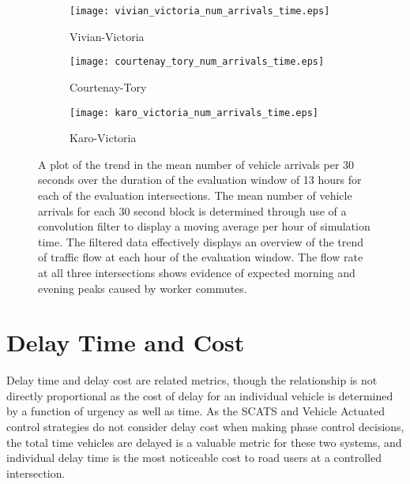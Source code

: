 \begin{figure}
\centering
\begin{subfigure}{.5\textwidth}
  \centering
  \texttt{[image: vivian\_victoria\_num\_arrivals\_time.eps]}
  \caption{Vivian-Victoria}
  \label{vehiclearrivalstime:sub1}
\end{subfigure}%
\begin{subfigure}{.5\textwidth}
  \centering
  \texttt{[image: courtenay\_tory\_num\_arrivals\_time.eps]}
  \caption{Courtenay-Tory}
  \label{vehiclearrivalstime:sub2}
\end{subfigure}

\vspace{1cm}

\begin{subfigure}{.5\textwidth}
  \centering
  \texttt{[image: karo\_victoria\_num\_arrivals\_time.eps]}
  \caption{Karo-Victoria}
  \label{vehiclearrivalstime:sub3}
\end{subfigure}%
\caption[Results of measuring the mean number of vehicle arrivals for each intersection evaluated.]{ A plot of the trend in the mean number of vehicle arrivals per 30 seconds over the duration of the evaluation window of 13 hours for each of the evaluation intersections. The mean number of vehicle arrivals for each 30 second block is determined through use of a convolution filter to display a moving average per hour of simulation time. The filtered data effectively displays an overview of the trend of traffic flow at each hour of the evaluation window. The flow rate at all three intersections shows evidence of expected morning and evening peaks caused by worker commutes. }
\label{eval:vehiclearrivalstime}
\end{figure}

\section {Delay Time and Cost}
\label{sec:incurred_delay_cost}

Delay time and delay cost are related metrics, though the relationship is not directly proportional as the cost of delay for an individual vehicle is determined by a function of urgency as well as time. As the SCATS and Vehicle Actuated control strategies do not consider delay cost when making phase control decisions, the total time vehicles are delayed is a valuable metric for these two systems, and individual delay time is the most noticeable cost to road users at a controlled intersection.

